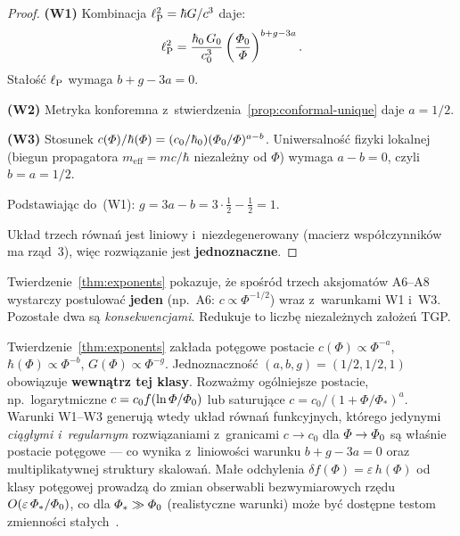 \begin{proof}
\textbf{(W1)} Kombinacja $\ell_{\mathrm{P}}^2 = \hbar G/c^3$ daje:
\[
  \ell_{\mathrm{P}}^2 = \frac{\hbar_0\,G_0}{c_0^3}
  \left(\frac{\varPhi_0}{\varPhi}\right)^{b+g-3a}.
\]
Sta\l{}o\'s\'c $\ell_{\mathrm{P}}$ wymaga $b + g - 3a = 0$.

\textbf{(W2)} Metryka konforemna z~stwierdzenia~\ref{prop:conformal-unique}
daje $a = 1/2$.

\textbf{(W3)} Stosunek $c(\varPhi)/\hbar(\varPhi) = (c_0/\hbar_0)(\varPhi_0/\varPhi)^{a-b}$.
Uniwersalno\'s\'c fizyki lokalnej (biegun propagatora $m_{\mathrm{eff}} = mc/\hbar$
niezale\.zny od $\Phi$) wymaga $a - b = 0$, czyli $b = a = 1/2$.

Podstawiaj\k{a}c do~(W1): $g = 3a - b = 3\cdot\frac{1}{2} - \frac{1}{2} = 1$.

Uk\l{}ad trzech r\'owna\'n jest liniowy i~niezdegenerowany
(macierz wsp\'o\l{}czynnik\'ow ma rz\k{a}d~3), wi\k{e}c
rozwi\k{a}zanie jest \textbf{jednoznaczne}.
\end{proof}

\begin{remark}
Twierdzenie~\ref{thm:exponents} pokazuje, \.ze spo\'sr\'od
trzech aksjomat\'ow A6--A8 wystarczy postulowa\'c \textbf{jeden}
(np.~A6: $c \propto \Phi^{-1/2}$) wraz z~warunkami W1 i~W3.
Pozosta\l{}e dwa s\k{a} \emph{konsekwencjami}. Redukuje to
liczb\k{e} niezale\.znych za\l{}o\.ze\'n TGP.
\end{remark}

\begin{remark}\label{rem:power-law-class}
Twierdzenie~\ref{thm:exponents} zak\l{}ada pot\k{e}gowe postacie
$c(\Phi)\propto\Phi^{-a}$, $\hbar(\Phi)\propto\Phi^{-b}$,
$G(\Phi)\propto\Phi^{-g}$. Jednoznaczno\'s\'c $(a,b,g)=(1/2,1/2,1)$
obowi\k{a}zuje \textbf{wewn\k{a}trz tej klasy}.
Rozwa\.zmy og\'olniejsze postacie, np.~logarytmiczne
$c = c_0 f(\ln\varPhi/\varPhi_0)$ lub saturuj\k{a}ce
$c = c_0/(1 + \Phi/\Phi_*)^a$. Warunki W1--W3 generuj\k{a} wtedy
uk\l{}ad r\'owna\'n funkcyjnych, kt\'orego jedynymi
\emph{ci\k{a}g\l{}ymi i~regularnym} rozwi\k{a}zaniami z~granicami
$c \to c_0$ dla $\varPhi\to\varPhi_0$ s\k{a} w\l{}a\'snie postacie
pot\k{e}gowe --- co wynika z~liniowo\'sci warunku $b+g-3a=0$ oraz
multiplikatywnej struktury skalowa\'n. Ma\l{}e odchylenia
$\delta f(\Phi) = \varepsilon\,h(\Phi)$ od klasy pot\k{e}gowej
prowadz\k{a} do zmian obserwabli bezwymiarowych rz\k{e}du
$O(\varepsilon\,\varPhi_*/\varPhi_0)$, co dla $\varPhi_*\gg\varPhi_0$
(realistyczne warunki) mo\.ze by\'c dost\k{e}pne testom
zmienno\'sci sta\l{}ych~\cite{Uzan2011}.
\end{remark}

